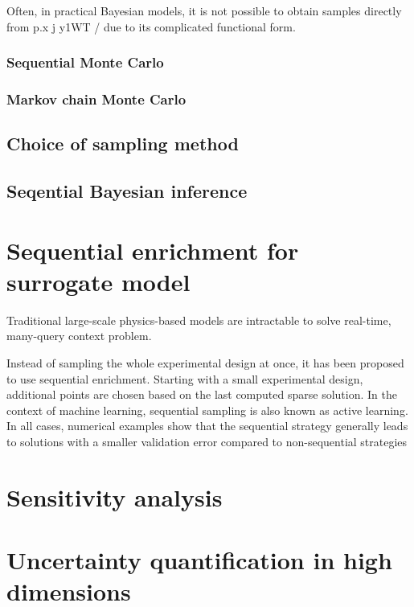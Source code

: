 Often, in practical Bayesian models, it is not possible to obtain samples directly from p.x j y1WT / due to its complicated functional form.

\subsubsection{Sequential Monte Carlo}


\subsubsection{Markov chain Monte Carlo}



\subsection{Choice of sampling method}


\subsection{Seqential Bayesian inference}


\section{Sequential enrichment for surrogate model}

Traditional large-scale physics-based models are intractable to solve real-time, many-query context problem. 


Instead of sampling the whole experimental design at once, it has been proposed to use sequential enrichment. Starting with
a small experimental design, additional points are chosen based on the last computed sparse
solution. In the context of machine learning, sequential sampling is also known as active learning.  In all cases, numerical examples show that the sequential strategy generally leads to solutions with
a smaller validation error compared to non-sequential strategies

\section{Sensitivity analysis}



\section{Uncertainty quantification in high dimensions}
